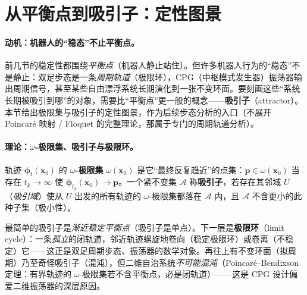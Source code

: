 \section{从平衡点到吸引子：定性图景}
\label{sec:ode-attractor}

\paragraph{动机：机器人的“稳态”不止平衡点。}
前几节的稳定性都围绕\emph{平衡点}（机器人静止站住）。但许多机器人行为的“稳态”不是静止：双足步态是一条\emph{周期轨道}（极限环），CPG（中枢模式发生器）振荡器输出周期信号，甚至某些自由漂浮系统长期演化到一张不变环面。要刻画这些“系统长期被吸引到哪”的对象，需要比“平衡点”更一般的概念——\textbf{吸引子}（attractor）。本节给出极限集与吸引子的定性图景，作为后续步态分析的入口（不展开 Poincaré 映射 / Floquet 的完整理论，那属于专门的周期轨道分析）。

\paragraph{理论：$\omega$-极限集、吸引子与极限环。}

\begin{definition}\label{def:attractor}
轨迹 $\boldsymbol{\phi}_t(\mathbf{x}_0)$ 的 \textbf{$\omega$-极限集} $\omega(\mathbf{x}_0)$ 是它“最终反复趋近”的点集：$\mathbf{p}\in\omega(\mathbf{x}_0)$ 当存在 $t_k\to\infty$ 使 $\boldsymbol{\phi}_{t_k}(\mathbf{x}_0)\to\mathbf{p}$。一个紧不变集 $\mathcal{A}$ 称\textbf{吸引子}，若存在其邻域 $U$（\emph{吸引域}）使从 $U$ 出发的所有轨迹的 $\omega$-极限集都落在 $\mathcal{A}$ 内，且 $\mathcal{A}$ 不含更小的此种子集（极小性）。
\end{definition}
\noindent 最简单的吸引子是\emph{渐近稳定平衡点}（吸引子是单点）。下一层是\textbf{极限环}（limit cycle）：一条\emph{孤立}的闭轨道，邻近轨迹螺旋地卷向（稳定极限环）或卷离（不稳定）它——这正是双足周期步态、振荡器的数学对象。再往上有不变环面（拟周期）乃至奇怪吸引子（混沌），但二维自治系统\emph{不可能混沌}（Poincaré--Bendixson 定理：有界轨迹的 $\omega$-极限集若不含平衡点，必是闭轨道）——这是 CPG 设计偏爱二维振荡器的深层原因。

